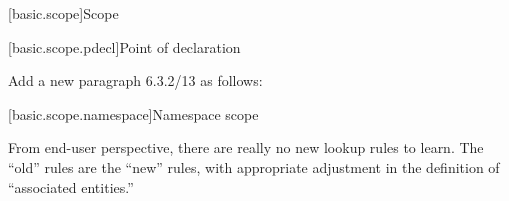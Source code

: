 \begin{extract*}
[basic.scope]{Scope}%

\begin{undecided}

\setcounter{subsection}{1}
[basic.scope.pdecl]{Point of declaration}

\noindent
Add a new paragraph 6.3.2/13 as follows:
\resetalinea[12]
\begin{std.txt}\color{addclr}
\alinea
\end{std.txt}

\end{undecided}

\setcounter{subsection}{5}
[basic.scope.namespace]{Namespace scope}

From end-user perspective, there are really no new lookup rules to
learn.  The ``old'' rules are the ``new'' rules, with appropriate
adjustment in the definition of ``associated entities.''


\end{extract*}
